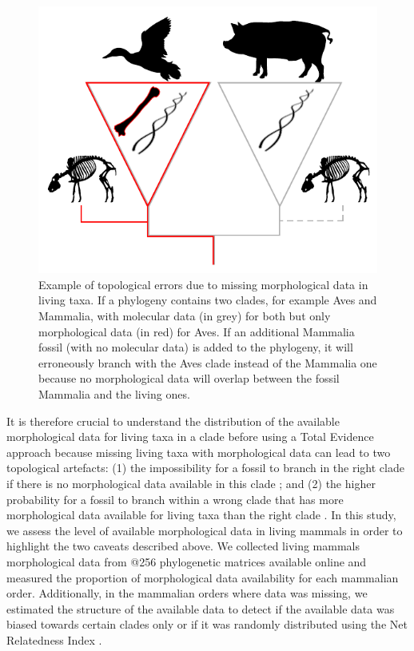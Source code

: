 \documentclass[12pt,letterpaper]{article}
\begin{document}
\begin{figure}[!htbp]
\centering
    \includegraphics[width=1\textwidth]{MissingDataFigure.pdf}
\caption{Example of topological errors due to missing morphological data in living taxa. If a phylogeny contains two clades, for example Aves and Mammalia, with molecular data (in grey) for both but only morphological data (in red) for Aves. If an additional Mammalia fossil (with no molecular data) is added to the phylogeny, it will erroneously branch with the Aves clade instead of the Mammalia one because no morphological data will overlap between the fossil Mammalia and the living ones.}
\label{Figure_missing_data_problem}
\end{figure}

It is therefore crucial to understand the distribution of the available morphological data for living taxa in a clade before using a Total Evidence approach because missing living taxa with morphological data can lead to two topological artefacts: (1) the impossibility for a fossil to branch in the right clade if there is no morphological data available in this clade \citep{GuillermeCooper}; and (2) the higher probability for a fossil to branch within a wrong clade that has more morphological data available for living taxa than the right clade \citep{GuillermeCooper}. In this study, we assess the level of available morphological data in living mammals in order to highlight the two caveats described above.
We collected living mammals morphological data from @256 phylogenetic matrices available online and measured the proportion of morphological data availability for each mammalian order. Additionally, in the mammalian orders where data was missing, we estimated the structure of the available data to detect if the available data was biased towards certain clades only or if it was randomly distributed using the Net Relatedness Index \citep{webb2002phylogenies}.
\end{document}
